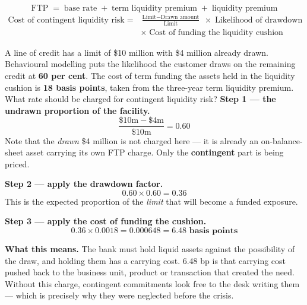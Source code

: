 \begin{lrfmlbox}
\[ \text{FTP} \;=\; \text{base rate} \;+\; \text{term liquidity premium} \;+\; \text{liquidity premium} \]
\vspace{4pt}
\begin{align*}
\text{Cost of contingent liquidity risk} \;=\;& \frac{\text{Limit} - \text{Drawn amount}}{\text{Limit}} \;\times\; \text{Likelihood of drawdown} \\[2pt]
&\times\; \text{Cost of funding the liquidity cushion}
\end{align*}
\end{lrfmlbox}

\begin{lrexbox}
A line of credit has a limit of \$10 million with \$4 million already drawn. Behavioural modelling puts the likelihood the customer draws on the remaining credit at \textbf{60 per cent}. The cost of term funding the assets held in the liquidity cushion is \textbf{18 basis points}, taken from the three-year term liquidity premium. What rate should be charged for contingent liquidity risk?
\tcblower
\textbf{Step 1 --- the undrawn proportion of the facility.}
\[ \frac{\$10\text{m} - \$4\text{m}}{\$10\text{m}} = 0.60 \]
Note that the \emph{drawn} \$4 million is not charged here --- it is already an on-balance-sheet asset carrying its own FTP charge. Only the \textbf{contingent} part is being priced.

\textbf{Step 2 --- apply the drawdown factor.}
\[ 0.60 \times 0.60 = 0.36 \]
This is the expected proportion of the \emph{limit} that will become a funded exposure.

\textbf{Step 3 --- apply the cost of funding the cushion.}
\[ 0.36 \times 0.0018 = 0.000648 = \mathbf{6.48\text{ basis points}} \]

\textbf{What this means.} The bank must hold liquid assets against the possibility of the draw, and holding them has a carrying cost. 6.48 bp is that carrying cost pushed back to the business unit, product or transaction that created the need. Without this charge, contingent commitments look free to the desk writing them --- which is precisely why they were neglected before the crisis.
\end{lrexbox}

